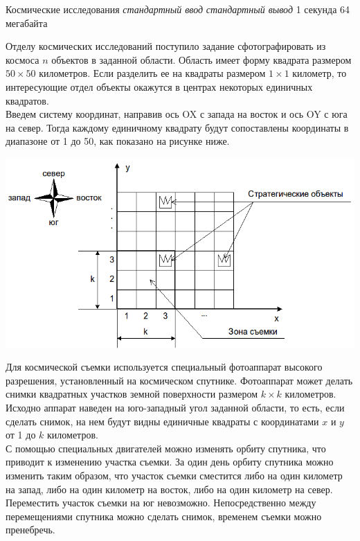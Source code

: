 \begin{problem}%
{Космические исследования}%
{\textsl{стандартный ввод}}%
{\textsl{стандартный вывод}}%
{1 секунда}%
{64 мегабайта}{}

Отделу космических исследований поступило задание сфотографировать из космоса $n$ объектов в заданной области. Область имеет форму квадрата размером $50 \times 50$ километров. Если разделить ее на квадраты размером $1 \times 1$ километр, то интересующие отдел объекты окажутся в центрах некоторых единичных квадратов.\\

Введем систему координат, направив ось OX с запада на восток и ось OY с юга на север. Тогда каждому единичному квадрату будут сопоставлены координаты в диапазоне от 1 до 50, как показано на рисунке ниже.

\begin{center}
    \includegraphics[scale=0.5]{images/2.png}
\end{center}

Для космической съемки используется специальный фотоаппарат высокого разрешения, установленный на космическом спутнике. Фотоаппарат может делать снимки квадратных участков земной поверхности размером $k \times k$  километров. Исходно аппарат наведен на юго-западный угол заданной области, то есть, если сделать снимок, на нем будут видны единичные квадраты с координатами $x$ и $y$ от 1 до $k$ километров.\\

С помощью специальных двигателей можно изменять орбиту спутника, что приводит к изменению участка съемки. За один день орбиту спутника можно изменить таким образом, что участок съемки сместится либо на один километр на запад, либо на один километр на восток, либо на один километр на север. Переместить участок съемки на юг невозможно. Непосредственно между перемещениями спутника можно сделать снимок, временем съемки можно пренебречь.\\


\end{problem}
